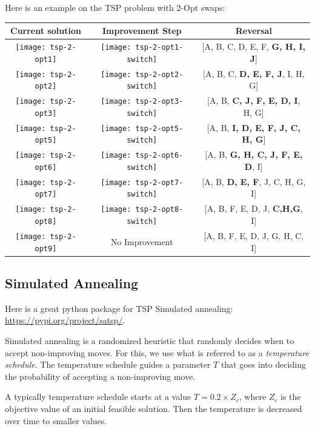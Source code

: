 Here is an example on the TSP problem with 2-Opt swaps:


\begin{longtable}{ccc}
\textbf{Current solution} & \textbf{Improvement Step} & \textbf{Reversal}\\
\hline
\texttt{[image: tsp-2-opt1]} & \texttt{[image: tsp-2-opt1-switch]} & 
[A, B, C, D, E, F, \textbf{G, H, I, J}]
\\
\texttt{[image: tsp-2-opt2]} & \texttt{[image: tsp-2-opt2-switch]} & 
[A, B, C, \textbf{D, E, F, J}, I, H, G]\\
\texttt{[image: tsp-2-opt3]} & \texttt{[image: tsp-2-opt3-switch]} & 
[A, B, \textbf{C, J, F, E, D, I}, H, G]
\\
\texttt{[image: tsp-2-opt5]} & \texttt{[image: tsp-2-opt5-switch]} & 
[A, B, \textbf{I, D, E, F, J, C, H, G}]
\\
\texttt{[image: tsp-2-opt6]} & \texttt{[image: tsp-2-opt6-switch]} & 
[A, B, \textbf{G, H, C, J, F, E, D}, I] 
\\
\texttt{[image: tsp-2-opt7]} & \texttt{[image: tsp-2-opt7-switch]} & 
[A, B, \textbf{D, E, F}, J, C, H, G, I] 
\\
\texttt{[image: tsp-2-opt8]} & \texttt{[image: tsp-2-opt8-switch]} & 
[A, B, F, E, D, J, \textbf{C,H,G}, I]  
\\
\texttt{[image: tsp-2-opt9]} & No Improvement& 
[A, B, F, E, D, J, G, H, C, I] 
\\
\hline
\hline
\end{longtable}



\subsection{Simulated Annealing}

Here is a great python package for TSP Simulated annealing: \url{https://pypi.org/project/satsp/}.

Simulated annealing is a randomized heuristic that randomly decides when to accept non-improving moves.  For this, we use what is referred to as a \emph{temperature schedule}.  The temperature schedule guides a parameter $T$ that goes into deciding the probability of accepting a non-improving move.

A typically temperature schedule starts at a value $T = 0.2 \times Z_c$, where $Z_c$ is the objective value of an initial feasible solution.  Then the temperature is decreased over time to smaller values.

